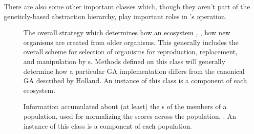 There are also some other important classes which, though they aren't part of the
gen\-et\-ic\-ly-based abstraction hierarchy, play important roles in \geco's operation.

\begin{description}

	\item[] \hfill \break
	The overall strategy which determines how an
	ecosystem , \ie, how new organisms are created
	from older organisms. This generally includes the overall scheme for selection of
	organisms for reproduction, replacement, and manipulation by s.
	Methods defined on this class will generally
	determine how a particular GA implementation differs from the canonical GA described
	by Holland. An instance of this class is a component of each ecosystem.
	
	\item [] \hfill \break
	Information accumulated about
	(at least) the s of the members of a population, used for normalizing the scores
	across the population, \etc. An instance of this class is a component of each population.

\end{description}


